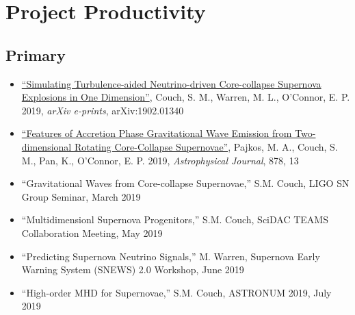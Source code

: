 \documentclass[12pt,titlepage]{article}
\begin{document}
\section{Project Productivity}

\subsection{Primary}

\begin{itemize}
    \item \href{https://ui.adsabs.harvard.edu/#abs/2019arXiv190201340C/abstract}{``Simulating Turbulence-aided Neutrino-driven Core-collapse Supernova Explosions in One Dimension''}, Couch, S. M., Warren, M. L., O'Connor, E. P. 2019, {\itshape arXiv e-prints}, arXiv:1902.01340 
    \item \href{https://ui.adsabs.harvard.edu/#abs/2019arXiv190109055P/abstract}{``Features of Accretion Phase Gravitational Wave Emission from Two-dimensional Rotating Core-Collapse Supernovae''}, Pajkos, M. A., Couch, S. M., Pan, K., O'Connor, E. P. 2019, {\itshape Astrophysical Journal}, 878, 13
\end{itemize}


\begin{itemize}
  \item ``Gravitational Waves from Core-collapse Supernovae,'' S.M. Couch, LIGO SN Group Seminar, March 2019
  \item ``Multidimensionl Supernova Progenitors,'' S.M. Couch, SciDAC TEAMS Collaboration Meeting, May 2019
  \item ``Predicting Supernova Neutrino Signals,'' M. Warren, Supernova Early Warning System (SNEWS) 2.0 Workshop, June 2019
  \item ``High-order MHD for Supernovae,'' S.M. Couch, ASTRONUM 2019, July 2019
\end{itemize}


\end{document}
